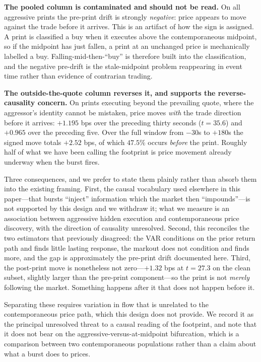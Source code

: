 \documentclass[11pt]{article}
\begin{document}
\textbf{The pooled column is contaminated and should not be read.} On all aggressive prints
the pre-print drift is strongly \emph{negative}: price appears to move against the trade
before it arrives. This is an artifact of how the sign is assigned. A print is classified a
buy when it executes above the contemporaneous midpoint, so if the midpoint has just fallen,
a print at an unchanged price is mechanically labelled a buy. Falling-mid-then-``buy'' is
therefore built into the classification, and the negative pre-drift is the stale-midpoint
problem reappearing in event time rather than evidence of contrarian trading.

\textbf{The outside-the-quote column reverses it, and supports the reverse-causality
concern.} On prints executing beyond the prevailing quote, where the aggressor's identity
cannot be mistaken, price moves \emph{with} the trade direction before it arrives:
$+1.195$ bps over the preceding thirty seconds ($t=35.6$) and $+0.965$ over the preceding
five. Over the full window from $-30$s to $+180$s the signed move totals $+2.52$ bps, of
which $47.5\%$ occurs \emph{before} the print. Roughly half of what we have been calling the
footprint is price movement already underway when the burst fires.

Three consequences, and we prefer to state them plainly rather than absorb them into the
existing framing. First, the causal vocabulary used elsewhere in this paper---that bursts
``inject'' information which the market then ``impounds''---is not supported by this design
and we withdraw it; what we measure is an association between aggressive hidden execution
and contemporaneous price discovery, with the direction of causality unresolved. Second,
this reconciles the two estimators that previously disagreed: the VAR conditions on the
prior return path and finds little lasting response, the markout does not condition and
finds more, and the gap is approximately the pre-print drift documented here. Third, the
post-print move is nonetheless not zero---$+1.32$ bps at $t=27.3$ on the clean subset,
slightly larger than the pre-print component---so the print is not \emph{merely} following
the market. Something happens after it that does not happen before it.

Separating these requires variation in flow that is unrelated to the contemporaneous price
path, which this design does not provide. We record it as the principal unresolved threat
to a causal reading of the footprint, and note that it does not bear on the
aggressive-versus-at-midpoint bifurcation, which is a comparison between two contemporaneous
populations rather than a claim about what a burst does to prices.
\end{document}
